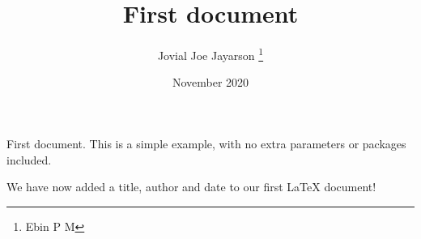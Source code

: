 \documentclass[12pt, a4paper]{article}
\title{First document}
\author{Jovial Joe Jayarson \thanks{Ebin P M}}
\date{November 2020}
\begin{document}
\maketitle

First document. This is a simple example, with no extra parameters or packages included.

We have now added a title, author and date to our first \LaTeX{} document!
\end{document}
